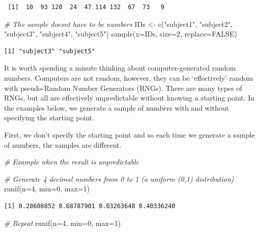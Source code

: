 \documentclass[
  oneside]{krantz}
\newenvironment{Shaded}{\begin{snugshade}}{\end{snugshade}}
\newcommand{\AttributeTok}[1]{\textcolor[rgb]{0.77,0.63,0.00}{#1}}
\newcommand{\CommentTok}[1]{\textcolor[rgb]{0.56,0.35,0.01}{\textit{#1}}}
\newcommand{\ConstantTok}[1]{\textcolor[rgb]{0.00,0.00,0.00}{#1}}
\newcommand{\DecValTok}[1]{\textcolor[rgb]{0.00,0.00,0.81}{#1}}
\newcommand{\FunctionTok}[1]{\textcolor[rgb]{0.00,0.00,0.00}{#1}}
\newcommand{\NormalTok}[1]{#1}
\newcommand{\OtherTok}[1]{\textcolor[rgb]{0.56,0.35,0.01}{#1}}
\newcommand{\StringTok}[1]{\textcolor[rgb]{0.31,0.60,0.02}{#1}}
\begin{document}
\begin{verbatim}
 [1]  10  93 120  24  47 114 132  67  73   9
\end{verbatim}

\begin{Shaded}
\begin{Highlighting}[]
\CommentTok{\# The sample doesn\textquotesingle{}t have to be numbers}
\NormalTok{IDs }\OtherTok{\textless{}{-}} \FunctionTok{c}\NormalTok{(}\StringTok{"subject1"}\NormalTok{, }\StringTok{"subject2"}\NormalTok{, }\StringTok{"subject3"}\NormalTok{, }\StringTok{"subject4"}\NormalTok{, }\StringTok{"subject5"}\NormalTok{)}
\FunctionTok{sample}\NormalTok{(}\AttributeTok{x=}\NormalTok{IDs, }\AttributeTok{size=}\DecValTok{2}\NormalTok{, }\AttributeTok{replace=}\ConstantTok{FALSE}\NormalTok{)}
\end{Highlighting}
\end{Shaded}

\begin{verbatim}
[1] "subject3" "subject5"
\end{verbatim}

It is worth spending a minute thinking about computer-generated random numbers. Computers are not random, however, they can be `effectively' random with pseudo-Random Number Generators (RNGs). There are many types of RNGs, but all are effectively unpredictable without knowing a starting point. In the examples below, we generate a sample of numbers with and without specifying the starting point.

First, we don't specify the starting point and so each time we generate a sample of numbers, the samples are different.

\begin{Shaded}
\begin{Highlighting}[]
\CommentTok{\# Example when the result is unpredictable}

\CommentTok{\# Generate 4 decimal numbers from 0 to 1 (a uniform (0,1) distribution) }
\FunctionTok{runif}\NormalTok{(}\AttributeTok{n=}\DecValTok{4}\NormalTok{, }\AttributeTok{min=}\DecValTok{0}\NormalTok{, }\AttributeTok{max=}\DecValTok{1}\NormalTok{)}
\end{Highlighting}
\end{Shaded}

\begin{verbatim}
[1] 0.28608852 0.68787901 0.03263648 0.40336240
\end{verbatim}

\begin{Shaded}
\begin{Highlighting}[]
\CommentTok{\# Repeat}
\FunctionTok{runif}\NormalTok{(}\AttributeTok{n=}\DecValTok{4}\NormalTok{, }\AttributeTok{min=}\DecValTok{0}\NormalTok{, }\AttributeTok{max=}\DecValTok{1}\NormalTok{)}
\end{Highlighting}
\end{Shaded}
\end{document}
